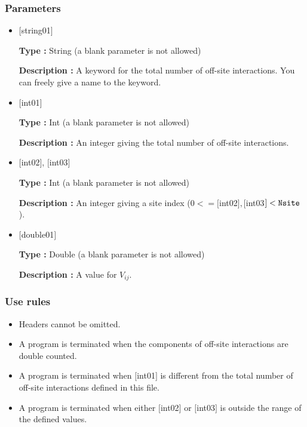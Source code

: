 \subsubsection{Parameters}
 \begin{itemize}

   \item  $[$string01$]$
   
    {\bf Type :} String (a blank parameter is not allowed)

   {\bf Description :} A keyword for the total number of off-site interactions. You can freely give a name to the keyword.

   \item  $[$int01$]$
   
    {\bf Type :} Int (a blank parameter is not allowed)

   {\bf Description :}  An integer giving the total number of off-site interactions.

  \item  $[$int02$]$, $[$int03$]$
  
 {\bf Type :} Int (a blank parameter is not allowed)

{\bf Description :} An integer giving a site index ($0<= [$int02$], [$int03$]<\verb|Nsite|$).
 
 \item  $[$double01$]$
   
   {\bf Type :} Double (a blank parameter is not allowed)

  {\bf Description :}  A value for $V_{ij}$.
  
\end{itemize}

\subsubsection{Use rules}
\begin{itemize}
\item Headers cannot be omitted. 
\item A program is terminated when the components of off-site interactions are double counted.
\item A program is terminated when $[$int01$]$ is different from the total number of off-site interactions defined in this file.
\item A program is terminated when either $[$int02$]$ or $[$int03$]$ is outside the range of the defined values.
\end{itemize}

\newpage
